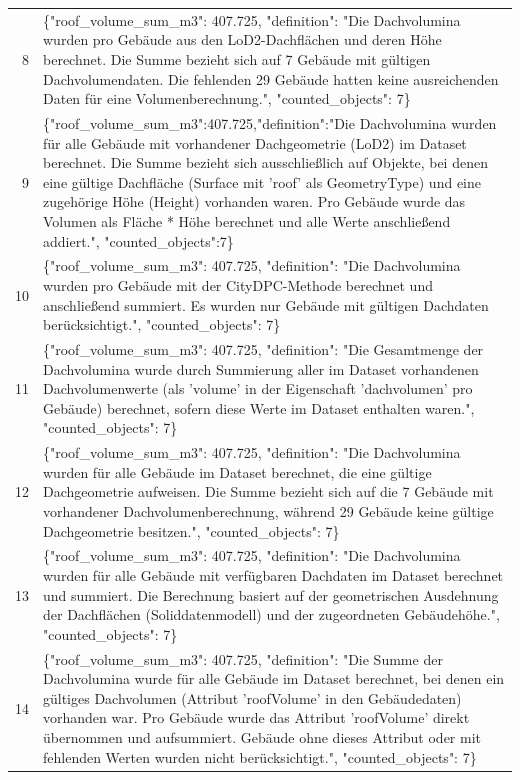 \documentclass[a4paper,11pt]{article}
\begin{document}
\begin{table}[ht]
\begin{tabular}{r p{12cm}}
8 & \{"roof\_volume\_sum\_m3": 407.725, "definition": "Die Dachvolumina wurden pro Gebäude aus den LoD2-Dachflächen und deren Höhe berechnet. Die Summe bezieht sich auf 7 Gebäude mit gültigen Dachvolumendaten. Die fehlenden 29 Gebäude hatten keine ausreichenden Daten für eine Volumenberechnung.", "counted\_objects": 7\} \\
9 & \{"roof\_volume\_sum\_m3":407.725,"definition":"Die Dachvolumina wurden für alle Gebäude mit vorhandener Dachgeometrie (LoD2) im Dataset berechnet. Die Summe bezieht sich ausschließlich auf Objekte, bei denen eine gültige Dachfläche (Surface mit 'roof' als GeometryType) und eine zugehörige Höhe (Height) vorhanden waren. Pro Gebäude wurde das Volumen als Fläche * Höhe berechnet und alle Werte anschließend addiert.", "counted\_objects":7\} \\
10 & \{"roof\_volume\_sum\_m3": 407.725, "definition": "Die Dachvolumina wurden pro Gebäude mit der CityDPC-Methode berechnet und anschließend summiert. Es wurden nur Gebäude mit gültigen Dachdaten berücksichtigt.", "counted\_objects": 7\} \\
11 & \{"roof\_volume\_sum\_m3": 407.725, "definition": "Die Gesamtmenge der Dachvolumina wurde durch Summierung aller im Dataset vorhandenen Dachvolumenwerte (als 'volume' in der Eigenschaft 'dachvolumen' pro Gebäude) berechnet, sofern diese Werte im Dataset enthalten waren.", "counted\_objects": 7\} \\
12 & \{"roof\_volume\_sum\_m3": 407.725, "definition": "Die Dachvolumina wurden für alle Gebäude im Dataset berechnet, die eine gültige Dachgeometrie aufweisen. Die Summe bezieht sich auf die 7 Gebäude mit vorhandener Dachvolumenberechnung, während 29 Gebäude keine gültige Dachgeometrie besitzen.", "counted\_objects": 7\} \\
13 & \{"roof\_volume\_sum\_m3": 407.725, "definition": "Die Dachvolumina wurden für alle Gebäude mit verfügbaren Dachdaten im Dataset berechnet und summiert. Die Berechnung basiert auf der geometrischen Ausdehnung der Dachflächen (Soliddatenmodell) und der zugeordneten Gebäudehöhe.", "counted\_objects": 7\} \\
14 & \{"roof\_volume\_sum\_m3": 407.725, "definition": "Die Summe der Dachvolumina wurde für alle Gebäude im Dataset berechnet, bei denen ein gültiges Dachvolumen (Attribut 'roofVolume' in den Gebäudedaten) vorhanden war. Pro Gebäude wurde das Attribut 'roofVolume' direkt übernommen und aufsummiert. Gebäude ohne dieses Attribut oder mit fehlenden Werten wurden nicht berücksichtigt.", "counted\_objects": 7\} \\

\end{tabular}
\end{table}
\end{document}
